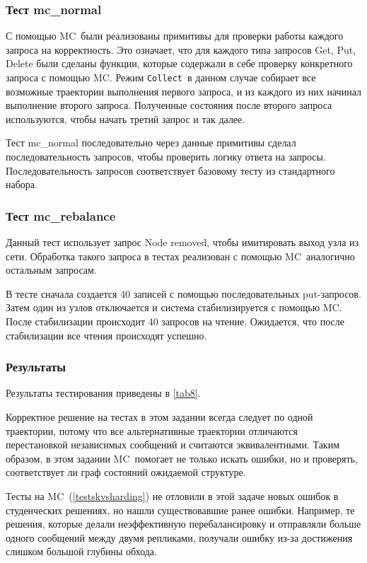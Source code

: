 \documentclass[a4paper,12pt]{extarticle}
\newcommand{\collect}[0]{\texttt{Collect}}
\newcommand{\mc}[0]{MC}
\begin{document}
\subsubsection{Тест mc\_normal}

С помощью \mc\ были реализованы примитивы для проверки работы каждого запроса на корректность.
Это означает, что для каждого типа запросов Get, Put, Delete были сделаны функции, которые содержали в себе проверку конкретного запроса с помощью \mc.
Режим \collect\ в данном случае собирает все возможные траектории выполнения первого запроса, и из каждого из них начинал выполнение второго запроса.
Полученные состояния после второго запроса используются, чтобы начать третий запрос и так далее.

Тест mc\_normal последовательно через данные примитивы сделал последовательность запросов, чтобы проверить логику ответа на запросы.
Последовательность запросов соответствует базовому тесту из стандартного набора.

\subsubsection{Тест mc\_rebalance}

Данный тест использует запрос Node removed, чтобы имитировать выход узла из сети.
Обработка такого запроса в тестах реализован с помощью \mc\ аналогично остальным запросам.

В тесте сначала создается 40 записей с помощью последовательных put-запросов.
Затем один из узлов отключается и система стабилизируется с помощью \mc.
После стабилизации происходит 40 запросов на чтение.
Ожидается, что после стабилизации все чтения происходят успешно.



\subsubsection{Результаты}

Результаты тестирования приведены в \cref{tab8}.

Корректное решение на тестах в этом задании всегда следует по одной траектории, потому что все альтернативные траектории отличаются перестановкой независимых сообщений и считаются эквивалентными.
Таким образом, в этом задании \mc\ помогает не только искать ошибки, но и проверять, соответствует ли граф состояний ожидаемой структуре.

Тесты на \mc\ (\cref{testskvsharding}) не отловили в этой задаче новых ошибок в студенческих решениях, но нашли существовавшие ранее ошибки.
Например, те решения, которые делали неэффективную перебалансировку и отправляли больше одного сообщений между двумя репликами, получали ошибку из-за достижения слишком большой глубины обхода.
\end{document}

